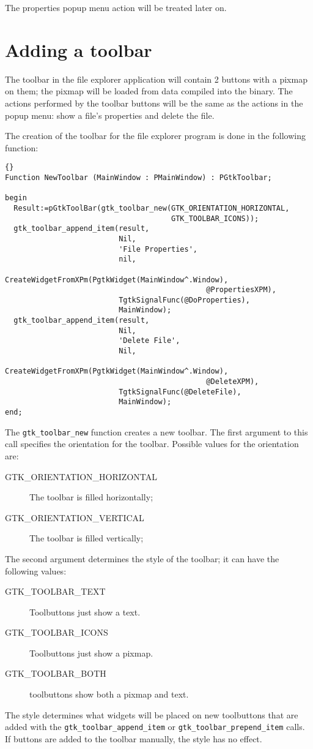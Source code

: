 \documentclass[10pt]{article}
\begin{document}
The properties popup menu action will be treated later on.

\section{Adding a toolbar}
The toolbar in the file explorer application will contain 2 buttons with
a pixmap on them; the pixmap will be loaded from data compiled into the
binary. The actions performed by the toolbar buttons will be the same as
the actions in the popup menu: show a file's properties and delete the file.

The creation of the toolbar for the file explorer program is done in the
following function:
\begin{lstlisting}{}
Function NewToolbar (MainWindow : PMainWindow) : PGtkToolbar;

begin
  Result:=pGtkToolBar(gtk_toolbar_new(GTK_ORIENTATION_HORIZONTAL,
                                      GTK_TOOLBAR_ICONS));
  gtk_toolbar_append_item(result,
                          Nil,
                          'File Properties',
                          nil,
                          CreateWidgetFromXPm(PgtkWidget(MainWindow^.Window),
                                              @PropertiesXPM),
                          TgtkSignalFunc(@DoProperties),
                          MainWindow);
  gtk_toolbar_append_item(result,
                          Nil,
                          'Delete File',
                          Nil,
                          CreateWidgetFromXPm(PgtkWidget(MainWindow^.Window),
                                              @DeleteXPM),
                          TgtkSignalFunc(@DeleteFile),
                          MainWindow);
end;
\end{lstlisting}
The \lstinline|gtk_toolbar_new| function creates a new toolbar. The first
argument to this call specifies the orientation for the toolbar. Possible
values for the orientation are:
\begin{description}
\item[GTK\_ORIENTATION\_HORIZONTAL] The toolbar is filled horizontally;
\item[GTK\_ORIENTATION\_VERTICAL] The toolbar is filled vertically;
\end{description}
The second argument determines the style of the toolbar; it can have the
following values:
\begin{description}
\item[GTK\_TOOLBAR\_TEXT] Toolbuttons just show a text.
\item[GTK\_TOOLBAR\_ICONS] Toolbuttons just show a pixmap.
\item[GTK\_TOOLBAR\_BOTH] toolbuttons show both a pixmap and text.
\end{description}
The style determines what widgets will be placed on new toolbuttons that
are added with the \lstinline|gtk_toolbar_append_item| or
\lstinline|gtk_toolbar_prepend_item| calls. If buttons are added to the 
toolbar manually, the style has no effect.
\end{document}
